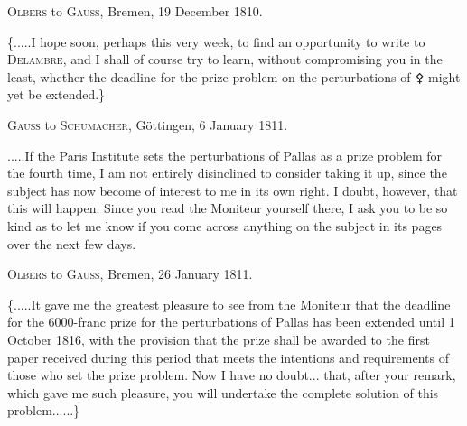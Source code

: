 \par\bigskip
{}
\begin{center}
\textsc{Olbers} to \textsc{Gauss}, Bremen, 19 December 1810.
\end{center}
\noindent\hspace*{\parindent}\{.\quad.\quad.\quad.\quad.\quad I hope soon, perhaps this very week, to find an opportunity to write to \textsc{Delambre}, and I shall of course try to learn, without compromising you in the least, whether the deadline for the prize problem on the perturbations of {\AstroSymbols ⚴} might yet be extended.\}
\par{}\bigskip
\begin{center}
\textsc{Gauss} to \textsc{Schumacher}, Göttingen, 6 January 1811.
\end{center}
\noindent\hspace*{\parindent}.\quad.\quad.\quad.\quad.\quad If the Paris Institute sets the perturbations of Pallas as a prize problem for the fourth time, I am not entirely disinclined to consider taking it up, since the subject has now become of interest to me in its own right. I doubt, however, that this will happen. Since you read the Moniteur yourself there, I ask you to be so kind as to let me know if you come across anything on the subject in its pages over the next few days.
\par\bigskip
\begin{center}
\textsc{Olbers} to \textsc{Gauss}, Bremen, 26 January 1811.
\end{center}
\noindent\hspace*{\parindent}\{.\quad.\quad.\quad.\quad.\quad It gave me the greatest pleasure to see from the Moniteur that the deadline for the 6000-franc prize for the perturbations of Pallas has been extended until 1 October 1816, with the provision that the prize shall be awarded to the first paper received during this period that meets the intentions and requirements of those who set the prize problem. Now I have no doubt\quad.\quad.\quad. that, after your remark, which gave me such pleasure, you will undertake the complete solution of this problem.\quad.\quad.\quad.\quad.\quad.\}
\par

